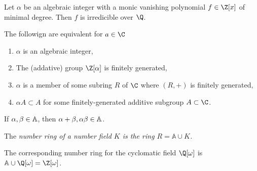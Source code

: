 \begin{theorem}
	Let $\alpha$ be an algebraic integer with a monic vanishing polynomial $f \in \Z[x]$ of minimal degree. Then $f$ is irredicible over $\Q$.
\end{theorem}

\begin{theorem}
	The followign are equivalent for $a \in \C$
	\begin{enumerate}
		\item $\alpha$ is an algebraic integer,
		\item The (addative) group $\Z[\alpha]$ is finitely generated,
		\item $\alpha$ is a member of some subring $R$ of $\C$ where $(R, +)$ is finitely generated,
		\item $\alpha A \subset A$ for some finitely-generated additive subgroup $A \subset \C$.
	\end{enumerate}
\end{theorem}

\begin{corrolary}
	If $\alpha, \beta \in \mathbb A$, then $\alpha + \beta, \alpha \beta \in \mathbb A$.
\end{corrolary}

\begin{definition}
	The \em{number ring} of a number field $K$ is the ring $R = \mathbb A \cup K$.
\end{definition}

\begin{example}
	The corresponding number ring for the cyclomatic field $\Q[\omega]$ is $\A \cup \Q[\omega] = \Z[\omega]$.
\end{example}


